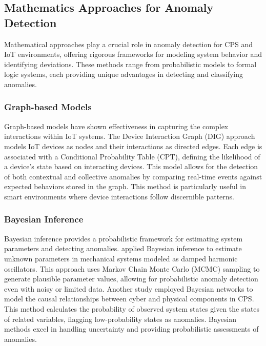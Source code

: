\subsection{Mathematics Approaches for Anomaly Detection}

Mathematical approaches play a crucial role in anomaly detection for CPS and IoT environments, offering rigorous frameworks for modeling system behavior and identifying deviations. These methods range from probabilistic models to formal logic systems, each providing unique advantages in detecting and classifying anomalies.

\subsubsection{Graph-based Models}

Graph-based models have shown effectiveness in capturing the complex interactions within IoT systems. The Device Interaction Graph (DIG) approach \cite{74} models IoT devices as nodes and their interactions as directed edges. Each edge is associated with a Conditional Probability Table (CPT), defining the likelihood of a device's state based on interacting devices. This model allows for the detection of both contextual and collective anomalies by comparing real-time events against expected behaviors stored in the graph. This method is particularly useful in smart environments where device interactions follow discernible patterns.

\subsubsection{Bayesian Inference}

Bayesian inference provides a probabilistic framework for estimating system parameters and detecting anomalies. \cite{51} applied Bayesian inference to estimate unknown parameters in mechanical systems modeled as damped harmonic oscillators. This approach uses Markov Chain Monte Carlo (MCMC) sampling to generate plausible parameter values, allowing for probabilistic anomaly detection even with noisy or limited data. Another study \cite{56} employed Bayesian networks to model the causal relationships between cyber and physical components in CPS. This method calculates the probability of observed system states given the states of related variables, flagging low-probability states as anomalies. Bayesian methods excel in handling uncertainty and providing probabilistic assessments of anomalies.

